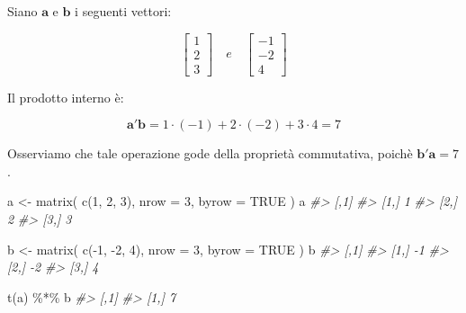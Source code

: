 \documentclass[
  11pt,
]{krantz}
\makeatletter
\newenvironment{Shaded}{\begin{snugshade}}{\end{snugshade}}
\newcommand{\AttributeTok}[1]{\textcolor[rgb]{0.61,0.61,0.61}{#1}}
\newcommand{\CommentTok}[1]{\textcolor[rgb]{0.37,0.37,0.37}{\textit{#1}}}
\newcommand{\ConstantTok}[1]{\textcolor[rgb]{0,0,0}{#1}}
\newcommand{\DecValTok}[1]{\textcolor[rgb]{0.06,0.06,0.06}{#1}}
\newcommand{\FunctionTok}[1]{\textcolor[rgb]{0,0,0}{#1}}
\newcommand{\NormalTok}[1]{#1}
\newcommand{\OtherTok}[1]{\textcolor[rgb]{0.37,0.37,0.37}{#1}}
\newcommand{\SpecialCharTok}[1]{\textcolor[rgb]{0,0,0}{#1}}
\newenvironment{kframe}{%
\medskip{}
\setlength{\fboxsep}{.8em}
 \def\at@end@of@kframe{}%
 \ifinner\ifhmode%
  \def\at@end@of@kframe{\end{minipage}}%
  \begin{minipage}{\columnwidth}%
 \fi\fi%
 \def\FrameCommand##1{\hskip\@totalleftmargin \hskip-\fboxsep
 \colorbox{shadecolor}{##1}\hskip-\fboxsep
     \hskip-\linewidth \hskip-\@totalleftmargin \hskip\columnwidth}%
 \MakeFramed {\advance\hsize-\width
   \@totalleftmargin\z@ \linewidth\hsize
   \@setminipage}}%
 {\par\unskip\endMakeFramed%
 \at@end@of@kframe}
\renewenvironment{Shaded}{\begin{kframe}}{\end{kframe}}
\theoremstyle{definition}
\theoremstyle{definition}
\theoremstyle{definition}
\theoremstyle{definition}
\theoremstyle{remark}
\makeatother
\begin{document}
Siano \(\boldsymbol{a}\) e \(\boldsymbol{b}\) i seguenti vettori:

\[
\left[ \begin{array}{c}
1 \\
2 \\
3
\end{array}
 \right] \quad e \quad
\left[ \begin{array}{c}
-1 \\
-2 \\
4
\end{array}
 \right]
 \]

Il prodotto interno è:

\[
\boldsymbol{a}'\boldsymbol{b}= 1 \cdot (-1) + 2 \cdot (-2) + 3
\cdot 4 = 7
\]

Osserviamo che tale operazione gode della proprietà commutativa, poichè \(\boldsymbol{b}'\boldsymbol{a}=7\).

\begin{Shaded}
\begin{Highlighting}[]
\NormalTok{a }\OtherTok{\textless{}{-}} \FunctionTok{matrix}\NormalTok{(}
  \FunctionTok{c}\NormalTok{(}\DecValTok{1}\NormalTok{, }\DecValTok{2}\NormalTok{, }\DecValTok{3}\NormalTok{),}
  \AttributeTok{nrow =} \DecValTok{3}\NormalTok{,}
  \AttributeTok{byrow =} \ConstantTok{TRUE}
\NormalTok{)}
\NormalTok{a}
\CommentTok{\#\textgreater{}      [,1]}
\CommentTok{\#\textgreater{} [1,]    1}
\CommentTok{\#\textgreater{} [2,]    2}
\CommentTok{\#\textgreater{} [3,]    3}
\end{Highlighting}
\end{Shaded}

\begin{Shaded}
\begin{Highlighting}[]
\NormalTok{b }\OtherTok{\textless{}{-}} \FunctionTok{matrix}\NormalTok{(}
  \FunctionTok{c}\NormalTok{(}\SpecialCharTok{{-}}\DecValTok{1}\NormalTok{, }\SpecialCharTok{{-}}\DecValTok{2}\NormalTok{, }\DecValTok{4}\NormalTok{),}
  \AttributeTok{nrow =} \DecValTok{3}\NormalTok{,}
  \AttributeTok{byrow =} \ConstantTok{TRUE}
\NormalTok{)}
\NormalTok{b}
\CommentTok{\#\textgreater{}      [,1]}
\CommentTok{\#\textgreater{} [1,]   {-}1}
\CommentTok{\#\textgreater{} [2,]   {-}2}
\CommentTok{\#\textgreater{} [3,]    4}
\end{Highlighting}
\end{Shaded}

\begin{Shaded}
\begin{Highlighting}[]
\FunctionTok{t}\NormalTok{(a) }\SpecialCharTok{\%*\%}\NormalTok{ b}
\CommentTok{\#\textgreater{}      [,1]}
\CommentTok{\#\textgreater{} [1,]    7}
\end{Highlighting}
\end{Shaded}
\end{document}

